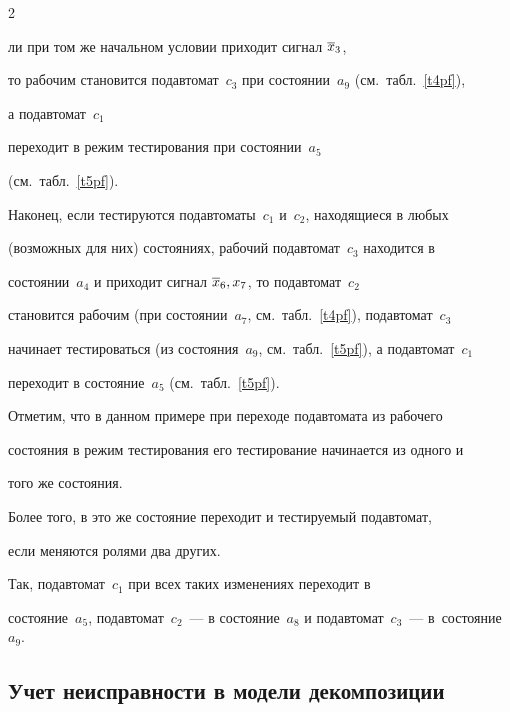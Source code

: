 \begin{multicols}{2}








\noindent


ли при том же начальном условии приходит сигнал $\overline x_3$,


то рабочим становится подавтомат~$c_3$ при со\-сто\-янии~$a_9$ (см.\  табл.~\ref{t4pf}),


а подавтомат~$c_1$


переходит в режим тестирования при со\-сто\-янии~$a_5$


(см.\ табл.~\ref{t5pf}).


Наконец, если тестируются подавтоматы~$c_1$ и~$c_2$, находящиеся в любых


(возможных для них) состояниях, рабочий подавтомат~$c_3$ находится в


со\-сто\-янии~$a_4$ и приходит сигнал $\overline x_6,x_7$, то подавтомат~$c_2$


становится рабочим (при со\-сто\-янии~$a_7$, см.\ табл.~\ref{t4pf}), подавтомат~$c_3$


начинает тестироваться (из со\-сто\-яния~$a_9$, см.\ табл.~\ref{t5pf}), а подавтомат~$c_1$


переходит в со\-сто\-яние~$a_5$ (см.\ табл.~\ref{t5pf}).





Отметим, что в данном примере при переходе подавтомата из рабочего


состояния в режим тестирования его тестирование начинается из одного и


того же состояния.


Более того, в это же состояние переходит и тестируемый подавтомат,


если меняются ролями два других.


Так, подавтомат~$c_1$ при всех таких изменениях переходит в


со\-сто\-яние~$a_5$, подавтомат~$c_2$~--- в со\-сто\-яние~$a_8$ и подавтомат~$c_3$~--- в~со\-сто\-яние~$a_9$.















\subsection{Учет неисправности в модели декомпозиции}






\end{multicols}
